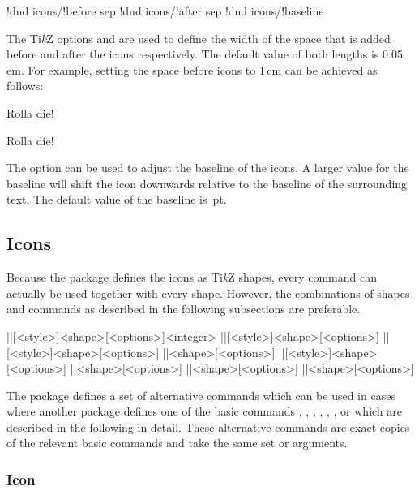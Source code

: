 \documentclass[a4paper]{article}
\begin{document}
\begin{macrodef}
!dnd icons/!before sep
!dnd icons/!after sep
!dnd icons/!baseline
\end{macrodef}
The Ti\emph{k}Z options  and  are used to define the width of the space that is added before and after the icons respectively. The default value of both lengths is 0.05\,em. For example, setting the space before icons to 1\,cm can be achieved as follows:

\begin{codeexample}
Rolla die!

Rolla die!
\end{codeexample}

The option  can be used to adjust the baseline of the icons. A larger value for the baseline will shift the icon downwards relative to the baseline of the surrounding text. The default value of the baseline is \,pt.

\subsection{Icons}

Because the package defines the icons as Ti\emph{k}Z shapes, every command can actually be used together with every shape. However, the combinations of shapes and commands as described in the following subsections are preferable.

\begin{macrodef}
|\dndiconsdie|[<style>]{<shape>}[<options>]{<integer>}
|\dndiconsability|[<style>]{<shape>}[<options>]
|\dndiconssaving|[<style>]{<shape>}[<options>]
|\dndiconsspell|{<shape>}[<options>]
|\dndiconsspellschool|[<style>]{<shape>}[<options>]
|\dndiconsdamage|{<shape>}[<options>]
|\dndiconsattack|{<shape>}[<options>]
|\dndiconscondition|{<shape>}[<options>]
\end{macrodef}
The package defines a set of alternative commands which can be used in cases where another package defines one of the basic commands \macro{\die}, \macro{\ability}, \macro{\saving}, \macro{\spell}, \macro{\spellschool}, \macro{\damage}, \macro{\attack} or \macro{\condition} which are described in the following in detail. These alternative commands are exact copies of the relevant basic commands and take the same set or arguments. 

\subsubsection[Icon \textbackslash die]{Icon }
\end{document}
